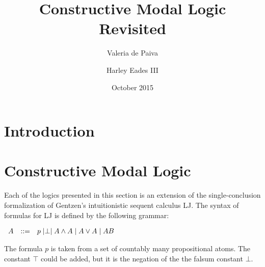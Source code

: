 \documentclass{article}
\title{Constructive Modal Logic Revisited}
\author{Valeria de Paiva \and Harley Eades III}
\date{October 2015}
\let\to\relax
\newcommand{\to}{\rightarrow}
\begin{document}
\maketitle

\section{Introduction}

\section{Constructive Modal Logic}

Each of the logics presented in this section is an extension of the
single-conclusion formalization of Gentzen's intuitionistic sequent
calculus LJ.  The syntax of formulas for LJ is defined by the
following grammar:
\begin{center}
    \begin{math}
        \begin{array}{lllllllll}
            A & ::= & p \mid \perp \mid A \land A \mid A \lor A \mid A \to B
        \end{array}
    \end{math}
\end{center}
The formula $p$ is taken from a set of countably many propositional atoms. The constant $\top$ could be added, but it is the negation of the the falsum constant $\bot$.
\end{document}
